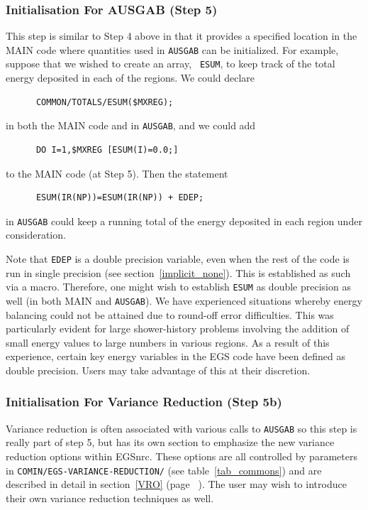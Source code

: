 \subsubsection{Initialisation For AUSGAB (Step 5)}
\label{step_5}


This step is similar to Step 4 above in that it provides a specified
location in the MAIN code where quantities used in {\tt AUSGAB} can be
initialized.  For example, suppose that we wished to create an array, {\tt
ESUM},
to keep track of the total energy deposited in each of the regions.  We
could declare
\begin{verbatim}
      COMMON/TOTALS/ESUM($MXREG);
\end{verbatim}
in both the MAIN code and in {\tt AUSGAB}, and we could add
\begin{verbatim}
      DO I=1,$MXREG [ESUM(I)=0.0;]
\end{verbatim}
to the MAIN code (at Step 5).  Then the statement
\begin{verbatim}
      ESUM(IR(NP))=ESUM(IR(NP)) + EDEP;
\end{verbatim}
in {\tt AUSGAB} could keep a running total of the energy deposited in each region
under consideration.

Note that {\tt EDEP} is a double precision
variable, even when the rest of the code is run in single precision (see
section~\ref{implicit_none}). This is established as such via a macro.  Therefore, one might wish to
establish {\tt ESUM} as double precision as well (in both MAIN and {\tt AUSGAB}).  We
have experienced situations whereby energy balancing could not be attained
due to round-off error difficulties.  This was particularly evident for
large shower-history problems involving the addition of small energy values
to large numbers in various regions.  As a result of this experience,
certain key energy variables in the EGS code have been defined as double
precision.  Users may take advantage of this at their discretion.

\subsubsection{Initialisation For Variance Reduction (Step 5b)}
\label{step_5b}
Variance reduction is often associated with various calls to {\tt AUSGAB} so this
step is really part of step 5, but has its own section to emphasize the new
variance reduction options within EGSnrc.  These options are all controlled
by parameters in {\tt COMIN/EGS-VARIANCE-REDUCTION/} (see
table~\ref{tab_commons}) and are described in detail in section~\ref{VRO}
(page ~\pageref{VRO}).  The user may wish to introduce their own
variance reduction techniques as well.





